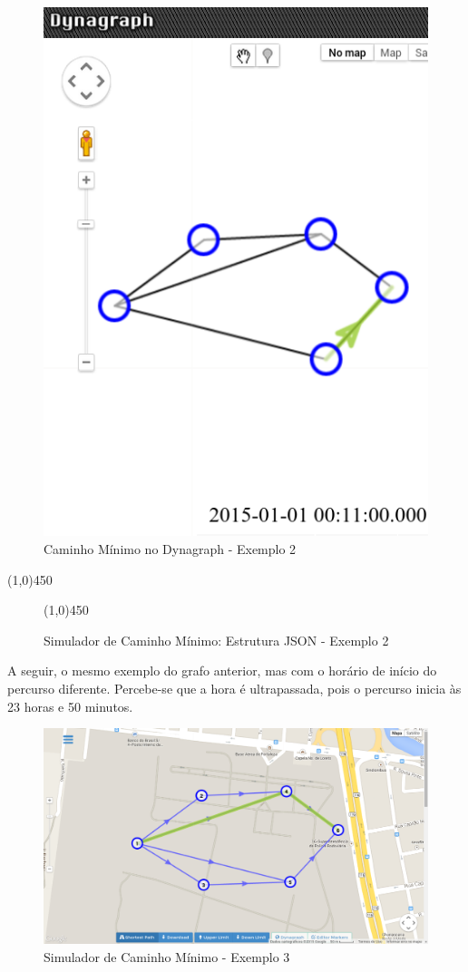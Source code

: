 \begin{figure}[htbp]
 \includegraphics[width=.35\textwidth]{chapters/fig/validacao/dyn2d.png}
\caption{Caminho Mínimo no Dynagraph - Exemplo 2}
\label{fig:dyn2}
\end{figure}
\FloatBarrier

\begin{center}
  \line(1,0){450}
\end{center}

\begin{figure}[htbp]
  \begin{center}
    \line(1,0){450}
  \end{center}
  \centering
  \caption{Simulador de Caminho Mínimo: Estrutura JSON - Exemplo 2}
  \label{fig:jsondyn2}
\end{figure}
\FloatBarrier

A seguir, o mesmo exemplo do grafo anterior, mas com o horário de início do percurso diferente.
Percebe-se que a hora é ultrapassada, pois o percurso inicia às 23 horas e 50 minutos.

\begin{figure}[htbp]
\centering
 \includegraphics[width=.70\textwidth]{chapters/fig/validacao/ex3.png}
\caption{Simulador de Caminho Mínimo - Exemplo 3}
\label{fig:ex3}
\end{figure}
\FloatBarrier

